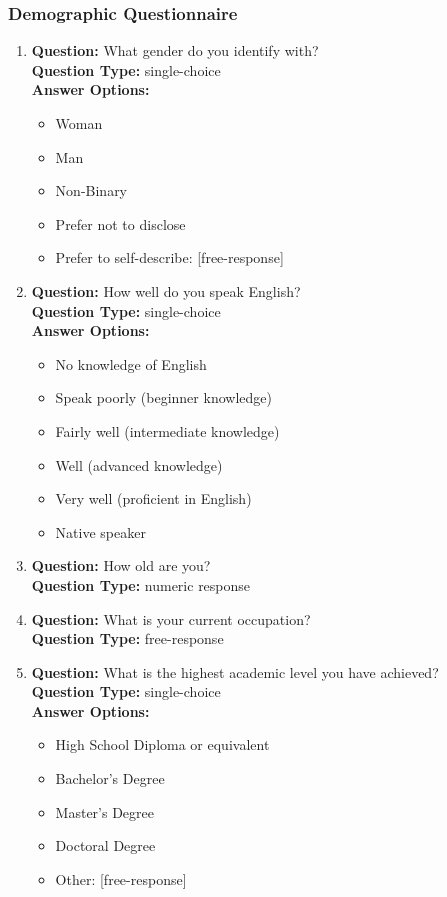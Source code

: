\subsubsection{Demographic Questionnaire}
\begin{enumerate}

\item
  \textbf{Question:} What gender do you identify with? \\
  \textbf{Question Type:} single-choice \\
  \textbf{Answer Options:}
  \begin{itemize}
    \item Woman
    \item Man
    \item Non-Binary
    \item Prefer not to disclose
    \item Prefer to self-describe: [free-response]
  \end{itemize}

\item
  \textbf{Question:} How well do you speak English? \\
  \textbf{Question Type:} single-choice \\
  \textbf{Answer Options:}
  \begin{itemize}
    \item No knowledge of English
    \item Speak poorly (beginner knowledge)
    \item Fairly well (intermediate knowledge)
    \item Well (advanced knowledge)
    \item Very well (proficient in English)
    \item Native speaker
  \end{itemize}

\item
  \textbf{Question:} How old are you? \\
  \textbf{Question Type:} numeric response

\item
  \textbf{Question:} What is your current occupation? \\
  \textbf{Question Type:} free-response

\item
  \textbf{Question:} What is the highest academic level you have achieved? \\
  \textbf{Question Type:} single-choice \\
  \textbf{Answer Options:}
  \begin{itemize}
    \item High School Diploma or equivalent
    \item Bachelor's Degree
    \item Master's Degree
    \item Doctoral Degree
    \item Other: [free-response]
  \end{itemize}


\end{enumerate}

